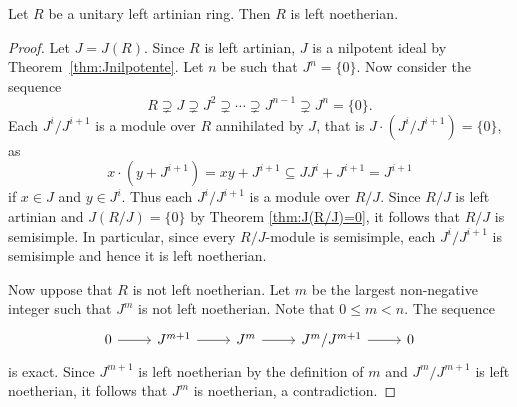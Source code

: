 



\begin{theorem}
	\label{thm:Hopkins-Levitski}
	Let $R$ be a unitary left artinian ring. Then $R$ is left noetherian.
\end{theorem}

\begin{proof}
	Let $J=J(R)$. Since $R$ is left artinian, $J$ is a nilpotent ideal 
	by Theorem~\ref{thm:Jnilpotente}. Let $n$ be such that $J^n=\{0\}$. Now consider the sequence 
	\[
		R\supsetneq J\supsetneq J^2\supsetneq\cdots\supsetneq J^{n-1}\supsetneq J^n=\{0\}.
	\]
	Each $J^{i}/J^{i+1}$ is a module over $R$ annihilated by $J$, 
	that is $J\cdot (J^i/J^{i+1})=\{0\}$, as 
	\[
	x\cdot (y+J^{i+1})=xy+J^{i+1}\subseteq JJ^i+J^{i+1}=J^{i+1} 
	\]
	if $x\in J$ and $y\in J^i$. 
	Thus each  
	$J^i/J^{i+1}$ is a module over $R/J$. Since $R/J$ is left artinian and 
	$J(R/J)=\{0\}$ by Theorem \ref{thm:J(R/J)=0}, it follows that $R/J$ is semisimple. 
	In particular, since every $R/J$-module is semisimple,  
	each $J^{i}/J^{i+1}$ 
	is semisimple and hence it is left noetherian. 
	
	Now uppose that $R$ is not left noetherian. Let $m$ be the largest non-negative integer
	such that $J^m$ is not left noetherian. Note that $0\leq m<n$. The sequence
	\[
	 \begin{tikzcd}
        0 & J^{m+1} & J^m & J^{m}/J^{m+1} & 0
        \arrow[from=1-1, to=1-2]
        \arrow[from=1-2, to=1-3]
        \arrow[from=1-3, to=1-4]
        \arrow[from=1-4, to=1-5]
    \end{tikzcd}
	\]
	is exact. Since $J^{m+1}$ is left noetherian by the definition of $m$ 
	and $J^m/J^{m+1}$ is left noetherian, it follows that 
	$J^m$ is noetherian, a contradiction. 
\end{proof}

